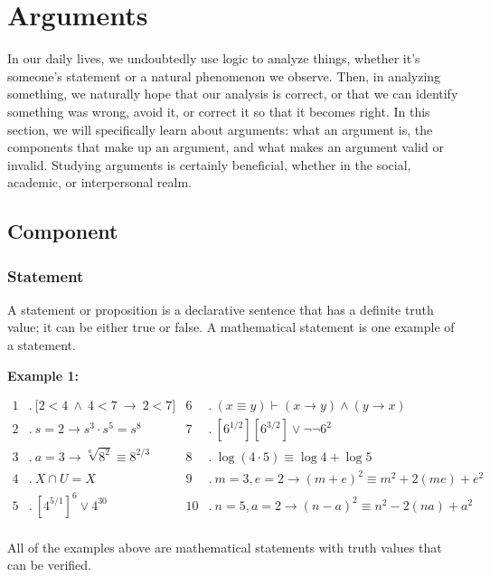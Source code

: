 \documentclass[12pt,a4paper,openany]{article}
\begin{document}
\section{Arguments}

In our daily lives, we undoubtedly use logic to analyze things, whether it's someone's statement or a natural phenomenon we observe. 
Then, in analyzing something, we naturally hope that our analysis is correct, or that we can identify something was wrong, avoid it, or correct it so that it becomes right. 
In this section, we will specifically learn about arguments: what an argument is, the components that make up an argument, and what makes an argument valid or invalid.
Studying arguments is certainly beneficial, whether in the social, academic, or interpersonal realm.

\subsection {Component}

\subsubsection{ Statement}\label{statement}

A statement or proposition is a declarative sentence that has a definite truth value; it can be either true or false.  A mathematical statement is one example of a statement.

\textbf{Example 1:}

\[
\begin{aligned}
1 &.\ \displaystyle\bigl[2<4 \ \wedge \ 4<7 \ \to \ 2<7 \bigr]
& 6 &.\ (x \equiv y) \vdash (x \to y) \land (y \to x) \ \\[2mm]
2 &.\ s =2 \to s^3 \cdot s^5 = s^8
& 7 &.\ \left[6^{1/2}\right]\left[6^{3/2}\right] \lor \neg \neg 6^2 \\[2mm]
3 &.\ a = 3 \to \sqrt[a]{8^2} \equiv 8^{2/3}
& 8 &.\ \log(4 \cdot 5) \equiv \log 4 + \log 5 \\[2mm]
4 &.\ X \cap U = X
& 9 &.\ m = 3, e = 2 \to (m+e)^2 \equiv m^2 + 2(me) + e^2 \\[2mm]
5 &.\ \left[4^{5/1}\right]^6 \lor 4^{30}
& 10 &.\ n = 5, a = 2 \to (n-a)^2 \equiv n^2 - 2(na) + a^2 \\[4mm]
\end{aligned}
\]

All of the examples above are mathematical statements with truth values that can be verified.
\end{document}
